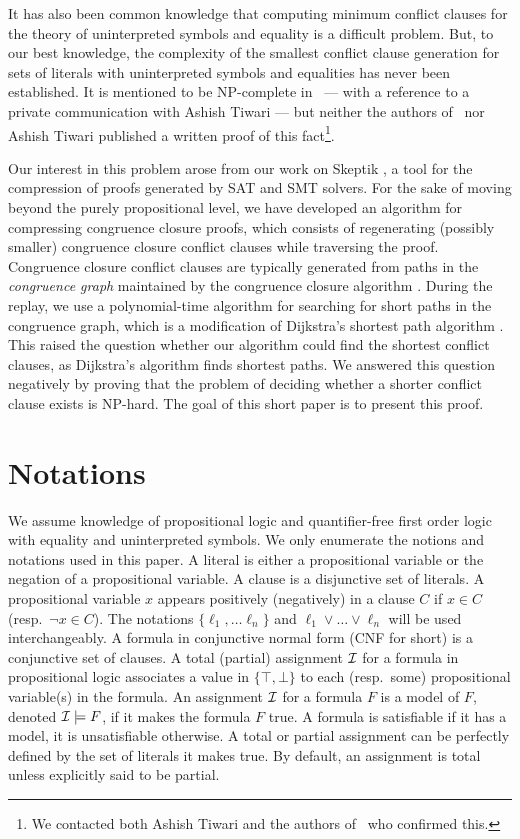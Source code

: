 \documentclass{easychair}
\begin{document}
It has also been common knowledge that computing minimum conflict clauses for
the theory of uninterpreted symbols and equality is a difficult problem.  But,
to our best knowledge, the complexity of the smallest conflict clause generation
for sets of literals with uninterpreted symbols and equalities has never been
established.  It is mentioned to be NP-complete in~\cite{Nieuwenhuis6} --- with
a reference to a private communication with Ashish Tiwari --- but neither the
authors of~\cite{Nieuwenhuis6} nor Ashish Tiwari published a written proof of
this fact\footnote{We contacted both Ashish Tiwari and the authors
  of~\cite{Nieuwenhuis6} who confirmed this.}.

Our interest in this problem arose from our work on Skeptik \cite{Boudou1}, a tool for the compression of proofs generated by SAT and SMT solvers. For the sake of moving beyond the purely propositional level, we have developed an algorithm for compressing congruence closure proofs, which consists of regenerating (possibly smaller) congruence closure conflict clauses while traversing the proof. Congruence closure conflict clauses are typically generated from paths in the \emph{congruence graph} maintained by the congruence closure algorithm \cite{Fontaine2004,Nieuwenhuis6,Nieuwenhuis9}. During the replay, we use a polynomial-time algorithm for searching for short paths in the congruence graph, which is a modification of Dijkstra's shortest path algorithm \cite{Dijkstra1959}. This raised the question whether our algorithm could find the shortest conflict clauses, as Dijkstra's algorithm finds shortest paths. We answered this question negatively by proving that the problem of deciding whether a shorter conflict clause exists is NP-hard. The goal of this short paper is to present this proof.

\section*{Notations}

We assume knowledge of propositional logic and quantifier-free first order logic
with equality and uninterpreted symbols.  We only enumerate the notions and
notations used in this paper.
A literal is either a propositional variable or the negation of a propositional
variable.  A clause is a disjunctive set of literals.  A propositional variable
$x$ appears positively (negatively) in a clause $C$ if $x \in C$ (resp.\ $\neg x
\in C$).  The notations $\{\ell_1, \dots \ell_n\}$ and $\ell_1 \vee \dots
\vee \ell_n$ will be used interchangeably.  A formula in conjunctive normal form (CNF
for short) is a conjunctive set of clauses.  A total (partial) assignment $\cal
I$ for a formula in propositional logic associates a value in $\{\top, \bot\}$
to each (resp.\ some) propositional variable(s) in the formula.  An assignment
$\cal I$ for a formula $F$ is a model of $F$, denoted ${\cal I}\models F$, if it makes
the formula $F$ true.  A formula is satisfiable if it has a model, it is
unsatisfiable otherwise.  A total or partial assignment can be perfectly
defined by the set of literals it makes true.  By default, an assignment is
total unless explicitly said to be partial.
\end{document}
